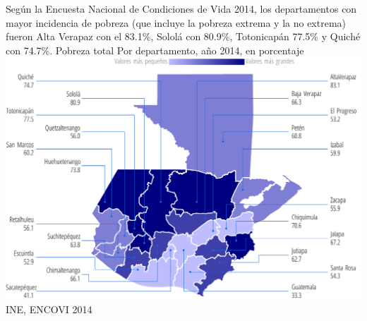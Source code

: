                      {%
                  Según la Encuesta Nacional de Condiciones de Vida 2014, los departamentos con mayor incidencia de pobreza (que incluye la pobreza extrema y la no extrema) fueron Alta Verapaz con el 83.1\%, Sololá con 80.9\%, Totonicapán 77.5\% y Quiché con 74.7\%. }%
                     {%
                     	Pobreza total
                     } %
                     {%
                     Por departamento, año 2014, en porcentaje} %
                     {%
                     	\includegraphics[width=52\cuadri]{graficas/1_19.pdf}}%
                     {%
                     	INE, ENCOVI 2014} %
                     
                    
